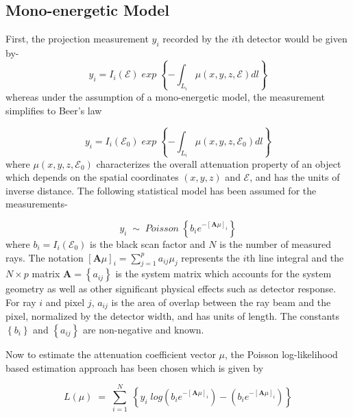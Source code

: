 \subsection{Mono-energetic Model}

First, the projection measurement $y_i$ recorded by the $i$th detector would be given by-
\begin{equation}
\label{eq40}
y_i = I_i (\mathcal{E}) \; exp \; \left\lbrace - \int_{L_i} \mu (x,y,z, \mathcal{E}) dl \right\rbrace
\end{equation} whereas under the assumption of a mono-energetic model, the measurement simplifies to Beer's law

\begin{equation}
\label{eq41}
y_i = I_i (\mathcal{E}_0) \; exp \; \left\lbrace - \int_{L_i} \mu (x,y,z, \mathcal{E}_0) dl \right\rbrace
\end{equation} where $\mu (x,y,z, \mathcal{E}_0)$ characterizes the overall attenuation property of an object which depends on the spatial coordinates $(x,y,z)$ and $\mathcal{E}$, and has the units of inverse distance. The following statistical model has been assumed for the measurements-

\begin{equation}
\label{eq42}
y_i \; \sim \;  Poisson \; \left\lbrace b_i e^{-\left[ \textbf{A}\mu \right]_i} \right\rbrace
\end{equation} where $b_i = I_i (\mathcal{E}_0)$ is the black scan factor and $N$ is the number of measured rays. The notation $\left[\textbf{A}\mu \right]_i = \sum\limits_{j=1}^p a_{ij}\mu_j$ represents the $i$th line integral and the $N \times p$ matrix $\textbf{A} = \left\lbrace a_{ij} \right\rbrace$ is the system matrix which accounts for the system geometry as well as other significant physical effects such as detector response. For ray $i$ and pixel $j$, $a_{ij}$ is the area of overlap between the ray beam and the pixel, normalized by the detector width, and has units of length. The constants $\left\lbrace b_i \right\rbrace$ and $\left\lbrace a_{ij} \right\rbrace$ are non-negative and known.

Now to estimate the attenuation coefficient vector $\mu$, the Poisson log-likelihood based estimation approach has been chosen which is given by

\begin{equation}
\label{eq43}
L (\mu) \; = \; \sum\limits_{i=1}^N  \; \left\lbrace y_i \; log \left( b_i e^{-\left[ \textbf{A}\mu \right]_i}\right) - \left( b_i e^{-\left[ \textbf{A}\mu \right]_i}\right) \right\rbrace
\end{equation} 

